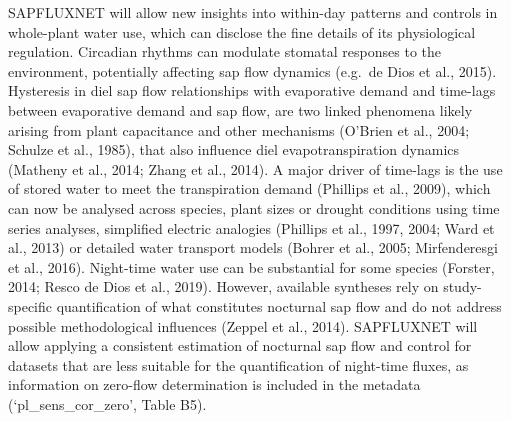 \documentclass[11pt,twoside]{reedthesis}
\begin{document}
SAPFLUXNET will allow new insights into within-day patterns and controls
in whole-plant water use, which can disclose the fine details of its
physiological regulation. Circadian rhythms can modulate stomatal
responses to the environment, potentially affecting sap flow dynamics
(e.g.~de Dios et al., 2015). Hysteresis in diel sap flow relationships
with evaporative demand and time-lags between evaporative demand and sap
flow, are two linked phenomena likely arising from plant capacitance and
other mechanisms (O'Brien et al., 2004; Schulze et al., 1985), that also
influence diel evapotranspiration dynamics (Matheny et al., 2014; Zhang
et al., 2014). A major driver of time-lags is the use of stored water to
meet the transpiration demand (Phillips et al., 2009), which can now be
analysed across species, plant sizes or drought conditions using time
series analyses, simplified electric analogies (Phillips et al., 1997,
2004; Ward et al., 2013) or detailed water transport models (Bohrer et
al., 2005; Mirfenderesgi et al., 2016). Night-time water use can be
substantial for some species (Forster, 2014; Resco de Dios et al.,
2019). However, available syntheses rely on study-specific
quantification of what constitutes nocturnal sap flow and do not address
possible methodological influences (Zeppel et al., 2014). SAPFLUXNET
will allow applying a consistent estimation of nocturnal sap flow and
control for datasets that are less suitable for the quantification of
night-time fluxes, as information on zero-flow determination is included
in the metadata (`pl\_sens\_cor\_zero', Table B5).\par
\end{document}
